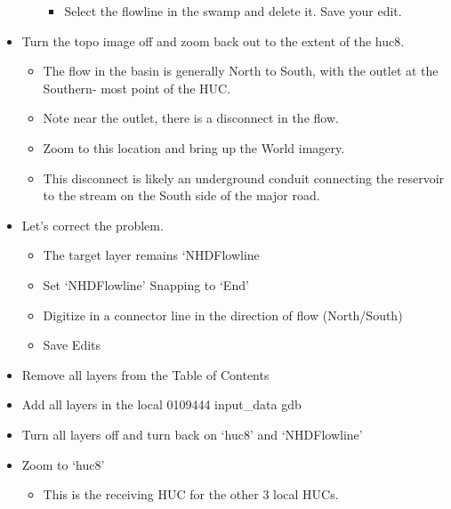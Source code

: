 \documentclass[letterpaper,10pt,english]{sphinxmanual}
\begin{document}
\begin{itemize}
\begin{itemize}
\begin{itemize}
\item {} 
Select the flowline in the swamp and delete it.  Save your edit.

\end{itemize}

\end{itemize}

\item {} 
Turn the topo image off and zoom back out to the extent of the huc8.
\begin{itemize}
\item {} 
The flow in the basin is generally North to South, with the outlet at the Southern- most point of the HUC.

\item {} 
Note near the outlet, there is a disconnect in the flow.

\item {} 
Zoom to this location and bring up the World imagery.

\item {} 
This disconnect is likely an underground conduit connecting the reservoir to the stream on the South side of the major road.

\end{itemize}

\item {} 
Let’s correct the problem.
\begin{itemize}
\item {} 
The target layer remains ‘NHDFlowline

\item {} 
Set ‘NHDFlowline’ Snapping to ‘End’

\item {} 
Digitize in a connector line in the direction of flow (North/South)

\item {} 
Save Edits

\end{itemize}

\item {} 
Remove all layers from the Table of Contents

\item {} 
Add all layers in the local 0109444 input\_data gdb

\item {} 
Turn all layers off and turn back on ‘huc8’ and ‘NHDFlowline’

\item {} 
Zoom to ‘huc8’
\begin{itemize}
\item {} 
This is the receiving HUC for the other 3 local HUCs.


\end{itemize}
\end{itemize}
\end{document}
